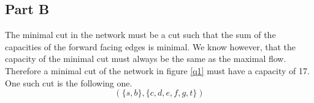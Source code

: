 \documentclass{article}
\begin{document}
\subsection*{Part B}

The minimal cut in the network must be a cut such that the sum of the capacities of the forward facing edges is minimal. We know however, that the capacity of the minimal cut must always be the same as the maximal flow. Therefore a minimal cut of the network in figure \ref{q1} must have a capacity of 17. One such cut is the following one.
\begin{equation*}
	(\{s, b\}, \{c, d, e, f, g, t\})
\end{equation*}
\end{document}

